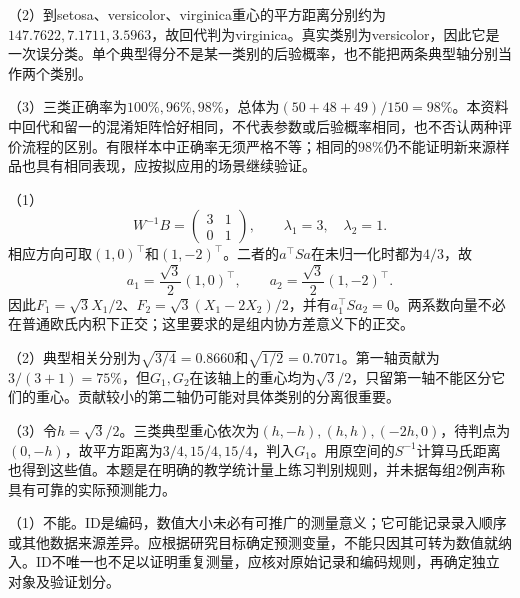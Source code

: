 （2）到setosa、versicolor、virginica重心的平方距离分别约为$147.7622,7.1711,3.5963$，故回代判为virginica。真实类别为versicolor，因此它是一次误分类。单个典型得分不是某一类别的后验概率，也不能把两条典型轴分别当作两个类别。

（3）三类正确率为$100\%,96\%,98\%$，总体为$(50+48+49)/150=98\%$。本资料中回代和留一的混淆矩阵恰好相同，不代表参数或后验概率相同，也不否认两种评价流程的区别。有限样本中正确率无须严格不等；相同的98\%仍不能证明新来源样品也具有相同表现，应按拟应用的场景继续验证。
\par\nobreak\smallskip{}

（1）
\[
W^{-1}B=\begin{pmatrix}3&1\\0&1\end{pmatrix},\qquad
\lambda_1=3,\quad\lambda_2=1.
\]
相应方向可取$(1,0)^\top$和$(1,-2)^\top$。二者的$a^\top Sa$在未归一化时都为$4/3$，故
\[
a_1=\frac{\sqrt3}{2}(1,0)^\top,\qquad
a_2=\frac{\sqrt3}{2}(1,-2)^\top.
\]
因此$F_1=\sqrt3X_1/2$、$F_2=\sqrt3(X_1-2X_2)/2$，并有$a_1^\top Sa_2=0$。两系数向量不必在普通欧氏内积下正交；这里要求的是组内协方差意义下的正交。

（2）典型相关分别为$\sqrt{3/4}=0.8660$和$\sqrt{1/2}=0.7071$。第一轴贡献为$3/(3+1)=75\%$，但$G_1,G_2$在该轴上的重心均为$\sqrt3/2$，只留第一轴不能区分它们的重心。贡献较小的第二轴仍可能对具体类别的分离很重要。

（3）令$h=\sqrt3/2$。三类典型重心依次为$(h,-h),(h,h),(-2h,0)$，待判点为$(0,-h)$，故平方距离为$3/4,15/4,15/4$，判入$G_1$。用原空间的$S^{-1}$计算马氏距离也得到这些值。本题是在明确的教学统计量上练习判别规则，并未据每组2例声称具有可靠的实际预测能力。
\par\nobreak\smallskip{}

（1）不能。ID是编码，数值大小未必有可推广的测量意义；它可能记录录入顺序或其他数据来源差异。应根据研究目标确定预测变量，不能只因其可转为数值就纳入。ID不唯一也不足以证明重复测量，应核对原始记录和编码规则，再确定独立对象及验证划分。


